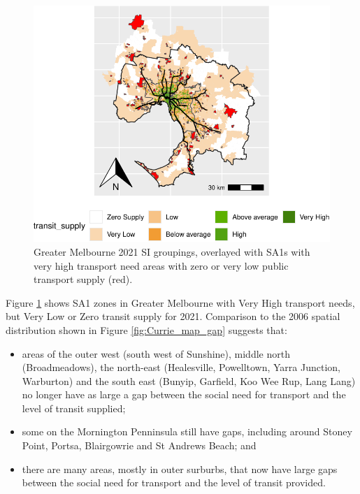 \documentclass[preprint, 3p,
authoryear]{elsarticle} %
\providecommand{\tightlist}{%
  \setlength{\itemsep}{0pt}\setlength{\parskip}{0pt}}
\begin{document}
\begin{figure}
\includegraphics[width=1\linewidth]{Leveraging_GTFS_to_assess_transit_supply_Transport_Geography_files/figure-latex/Greater_Melbourne_2021_needs_gap_map-1} \caption{Greater Melbourne 2021 SI groupings, overlayed with SA1s with very high transport need areas with zero or very low public transport supply (red).}\label{fig:Greater_Melbourne_2021_needs_gap_map}
\end{figure}

Figure \ref{fig:Greater_Melbourne_2021_needs_gap_map} shows SA1 zones in
Greater Melbourne with Very High transport needs, but Very Low or Zero
transit supply for 2021. Comparison to the 2006 spatial distribution
shown in Figure \ref{fig:Currie_map_gap} suggests that:

\begin{itemize}
\tightlist
\item
  areas of the outer west (south west of Sunshine), middle north
  (Broadmeadows), the north-east (Healesville, Powelltown, Yarra
  Junction, Warburton) and the south east (Bunyip, Garfield, Koo Wee
  Rup, Lang Lang) no longer have as large a gap between the social need
  for transport and the level of transit supplied;
\item
  some on the Mornington Penninsula still have gaps, including around
  Stoney Point, Portsa, Blairgowrie and St Andrews Beach; and
\item
  there are many areas, mostly in outer surburbs, that now have large
  gaps between the social need for transport and the level of transit
  provided.
\end{itemize}
\end{document}
